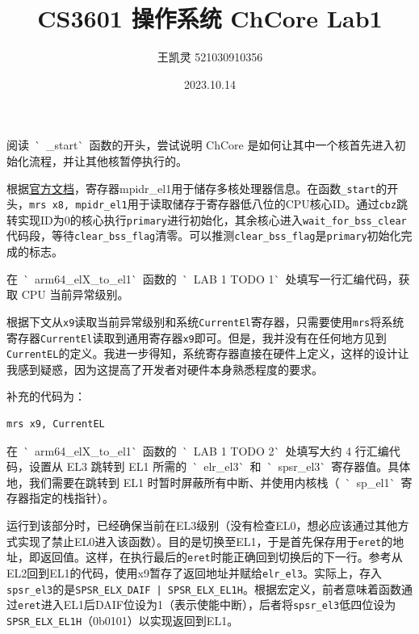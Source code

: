 \documentclass{article}
\newcommand{\customthmname}{}
\newenvironment{prob}[1]
{\renewcommand{\customthmname}{#1}%
	\innercustomthm}
{\endinnercustomthm}
\begin{document}
	\title{CS3601 操作系统 ChCore Lab1}
	\author{王凯灵 521030910356}
	\date{2023.10.14}
	\maketitle
	\begin{prob}{思考题}
		阅读~\`~\_start\`~函数的开头，尝试说明 ChCore 是如何让其中一个核首先进入初始化流程，并让其他核暂停执行的。
	\end{prob}
	
	根据\href{https://developer.arm.com/documentation/ddi0601/2023-09/AArch64-Registers/MPIDR-EL1--Multiprocessor-Affinity-Register?lang=en}{官方文档}，寄存器mpidr\_el1用于储存多核处理器信息。在函数\texttt{\_start}的开头，\texttt{mrs	x8, mpidr\_el1}用于读取储存于寄存器低八位的CPU核心ID。通过\texttt{cbz}跳转实现ID为0的核心执行\texttt{primary}进行初始化，其余核心进入\texttt{wait\_for\_bss\_clear}代码段，等待\texttt{clear\_bss\_flag}清零。可以推测\texttt{clear\_bss\_flag}是\texttt{primary}初始化完成的标志。
	
	\begin{prob}{练习题}
		在~\`~arm64\_elX\_to\_el1\`~函数的~\`~LAB 1 TODO 1\`~处填写一行汇编代码，获取 CPU 当前异常级别。
	\end{prob}

	根据下文从\texttt{x9}读取当前异常级别和系统\texttt{CurrentEl}寄存器，只需要使用\texttt{mrs}将系统寄存器\texttt{CurrentEl}读取到通用寄存器\texttt{x9}即可。但是，我并没有在任何地方见到\texttt{CurrentEL}的定义。我进一步得知，系统寄存器直接在硬件上定义，这样的设计让我感到疑惑，因为这提高了开发者对硬件本身熟悉程度的要求。
	
	补充的代码为：
	\begin{lstlisting}[style=armasm]
	mrs x9, CurrentEL 
	\end{lstlisting}
	
	\begin{prob}{练习题}
		在~\`~arm64\_elX\_to\_el1\`~函数的~\`~LAB 1 TODO 2\`~处填写大约 4 行汇编代码，设置从 EL3 跳转到 EL1 所需的~\`~elr\_el3\`~和~\`~spsr\_el3\`~寄存器值。具体地，我们需要在跳转到 EL1 时暂时屏蔽所有中断、并使用内核栈（~\`~sp\_el1\`~寄存器指定的栈指针）。
	\end{prob}

	运行到该部分时，已经确保当前在EL3级别（没有检查EL0，想必应该通过其他方式实现了禁止EL0进入该函数）。目的是切换至EL1，于是首先保存用于\texttt{eret}的地址，即返回值。这样，在执行最后的\texttt{eret}时能正确回到切换后的下一行。参考从EL2回到EL1的代码，使用x9暂存了返回地址并赋给\texttt{elr\_el3}。实际上，存入\texttt{spsr\_el3}的是\texttt{SPSR\_ELX\_DAIF | SPSR\_ELX\_EL1H}。根据宏定义，前者意味着函数通过\texttt{eret}进入EL1后DAIF位设为1（表示使能中断），后者将\texttt{spsr\_el3}低四位设为\texttt{SPSR\_ELX\_EL1H}（0b0101）以实现返回到EL1。
	
\end{document}
